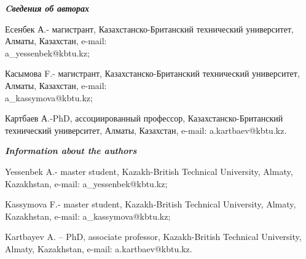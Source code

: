 \begin{authorinfo}
\emph{{\bfseries Cведения об авторах}}

Есенбек А.- магистрант, Казахстанско-Британский технический университет,
Алматы, Казахстан, e-mail: \\a\_yessenbek@kbtu.kz;

Касымова F.- магистрант, Казахстанско-Британский технический
университет, Алматы, Казахстан, e-mail: \\a\_kassymova@kbtu.kz;

Картбаев А.-PhD, ассоциированный профессор, Казахстанско-Британский
технический университет, Алматы, Казахстан, e-mail: a.kartbaev@kbtu.kz.

\emph{{\bfseries Information about the authors}}

Yessenbek A.- master student, Kazakh-British Technical University,
Almaty, Kazakhstan, e-mail: a\_yessenbek@kbtu.kz;

Kassymova F.- master student, Kazakh-British Technical University,
Almaty, Kazakhstan, e-mail: a\_kassymova@kbtu.kz;

Kartbayev A. -- PhD, associate professor, Kazakh-British Technical
University, Almaty, Kazakhstan, e-mail: a.kartbaev@kbtu.kz.
\end{authorinfo}

